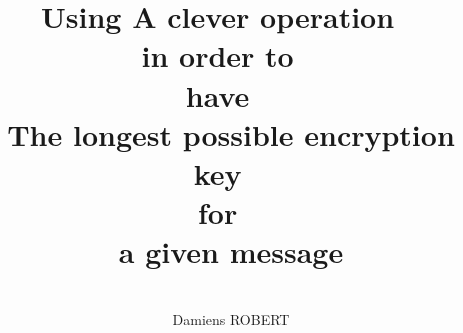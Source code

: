 \documentclass{article}
\title{Using A clever operation
~\\
in order to
~\\
have
~\\
The longest possible encryption key
~\\
for
~\\
a given message
}
\date{
~\\
}
\author{
~\\
Damiens ROBERT
}
\begin{document}
  \maketitle
  \section{}
\end{document}
